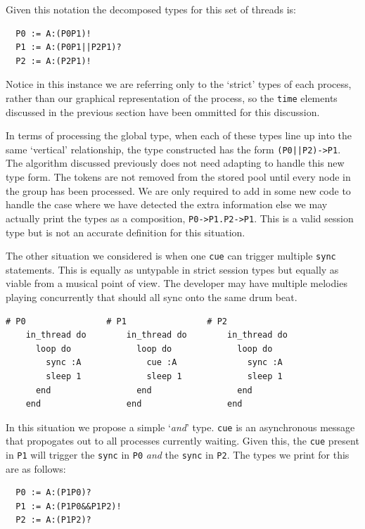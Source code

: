 \documentclass[11pt, abstracton, twoside, titlepage=true]{scrartcl}
\begin{document}
Given this notation the
decomposed types for this set of threads is:
\\
\begin{lstlisting}
  P0 := A:(P0P1)!
  P1 := A:(P0P1||P2P1)?
  P2 := A:(P2P1)!
\end{lstlisting}

Notice in this instance we are referring only to the `strict' types of each 
process, rather than our graphical representation of the process, so the
\texttt{time} elements discussed in the previous section have been ommitted 
for this discussion.

In terms of processing the global type, when each of these types line up
into the same `vertical' relationship, the type constructed has the form 
\texttt{(P0||P2)->P1}. The algorithm discussed previously does not need
adapting to handle this new type form. The tokens are not removed from the
stored pool until every node in the group has been processed. We are only
required to add in some new code to handle the case where we have detected
the extra information else we may actually print the types as a composition,
\texttt{P0->P1.P2->P1}. This is a valid session type but is not an accurate
definition for this situation.

The other situation we considered is when one \texttt{cue} can trigger
multiple \texttt{sync} statements. This is equally as untypable in strict
session types but equally as viable from a musical point of view. The developer
may have multiple melodies playing concurrently that should all sync onto the
same drum beat.

\begin{minipage}{\textwidth}
	\begin{lstlisting}[style = sonicpi]
    # P0                # P1                # P2
    in_thread do        in_thread do        in_thread do
      loop do             loop do             loop do
        sync :A             cue :A              sync :A
        sleep 1             sleep 1             sleep 1
      end                 end                 end
    end                 end                 end
	\end{lstlisting}
\end{minipage}

In this situation we propose a simple `\emph{and}' type. \texttt{cue} is an
asynchronous message that propogates out to all processes currently waiting.
Given this, the \texttt{cue} present in \texttt{P1} will trigger the \texttt{sync}
in \texttt{P0} \emph{and} the \texttt{sync} in \texttt{P2}. The types we 
print for this are as follows:
\\
\begin{lstlisting}
  P0 := A:(P1P0)?
  P1 := A:(P1P0&&P1P2)!
  P2 := A:(P1P2)?
\end{lstlisting}
\end{document}
